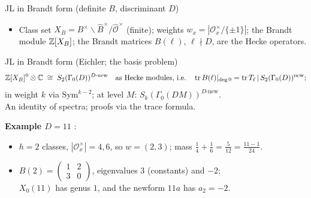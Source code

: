 \begin{frame}{JL in Brandt form (definite $B$, discriminant $D$)}
  \small
  \begin{itemize}\setlength{\itemsep}{2pt}
    \item Class set $X_B=B^\times\backslash\widehat B^\times/\widehat{\mathcal O}^\times$ (finite); weights $w_x=|\mathcal O_x^\times/\{\pm1\}|$;
      the Brandt module $\mathbb{Z}[X_B]$; the Brandt matrices $B(\ell)$, $\ell\nmid D$, are the Hecke operators.
  \end{itemize}
  \begin{block}{JL in Brandt form (Eichler; the basis problem)}
    \[\mathbb{Z}[X_B]^0\otimes\mathbb C\;\cong\;S_2(\Gamma_0(D))^{D\text{-new}}\quad\text{as Hecke modules, i.e.}\quad
      \operatorname{tr}B(\ell)|_{\deg 0}=\operatorname{tr}T_\ell\,|\,S_2(\Gamma_0(D))^{\mathrm{new}};\]
    in weight $k$ via $\mathrm{Sym}^{k-2}$; at level $M$: $S_k(\Gamma_0(DM))^{D\text{-new}}$.\\
    An identity of spectra; proofs via the trace formula.
  \end{block}
  \textbf{Example $D=11$} :
  \begin{itemize}\setlength{\itemsep}{1pt}
    \item $h=2$ classes, $|\mathcal O_x^\times|=4,6$, so $w=(2,3)$; mass $\tfrac14+\tfrac16=\tfrac5{12}=\tfrac{11-1}{24}$.
    \item $B(2)=\left(\begin{smallmatrix}1&2\\3&0\end{smallmatrix}\right)$, eigenvalues $3$ (constants) and $-2$;\\
      $X_0(11)$ has genus $1$, and the newform $11a$ has $a_2=-2$.
  \end{itemize}
\end{frame}
